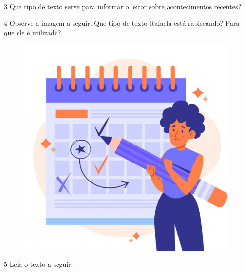 



\num{3} Que tipo de texto serve para informar o leitor sobre acontecimentos recentes?


\pagebreak

\num{4} Observe a imagem a seguir. Que tipo de texto Rafaela está rabiscando? Para que ele é utilizado?

\begin{figure}[H]
\center
\includegraphics[width=.55\textwidth]{media/image187.jpg}
\end{figure}




\num{5} Leia o texto a seguir.

